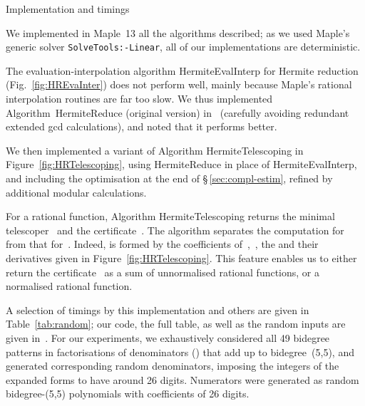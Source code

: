 \documentclass{sig-alt-full}
\begin{document}
\begin{section}{Implementation and timings}\label{sec:implementation}

We implemented in Maple~13 all the algorithms described;
as we used Maple's generic solver \verb+SolveTools:-Linear+,
all of our implementations are deterministic.

The evaluation-interpolation algorithm \textsf{HermiteEvalInterp}
for Hermite reduction (Fig.~\ref{fig:HREvaInter}) does not
perform well, mainly because Maple's rational interpolation routines
are far too slow.
We thus implemented Algorithm~\textsf{HermiteReduce} (original
version) in~\cite[\S\,2.2]{BronsteinBook} (carefully avoiding
redundant extended gcd calculations), and noted that it performs
better.

We then implemented a variant of Algorithm \textsf{HermiteTelescoping}
in Figure~\ref{fig:HRTelescoping}, using \textsf{HermiteReduce} in
place of \textsf{HermiteEvalInterp}, and including the optimisation at
the end of \S\,\ref{sec:compl-estim},
refined by additional modular calculations.

For a rational function,
Algorithm \textsf{HermiteTelescoping} returns the minimal telescoper~ and the certificate~.
The algorithm separates the computation for~
from that for~.  Indeed,  is formed by
the coefficients of~,~, the  and their derivatives given in Figure~\ref{fig:HRTelescoping}.
This feature enables us to either return the certificate~ as a sum of unnormalised rational functions,
or a normalised rational function.

A selection of timings by this implementation and others are given in
Table~\ref{tab:random};
our code, the full table, as well as the random inputs
are given in~\cite{OurSoft}.
For our experiments, we exhaustively
considered all 49 bidegree patterns in factorisations of denominators
 () that add up to bidegree~(5,5), and
generated corresponding random denominators, imposing the
integers of the expanded forms to have around 26 digits.
Numerators were generated as random bidegree-(5,5) polynomials with
coefficients of 26 digits.


\end{section}
\end{document}
